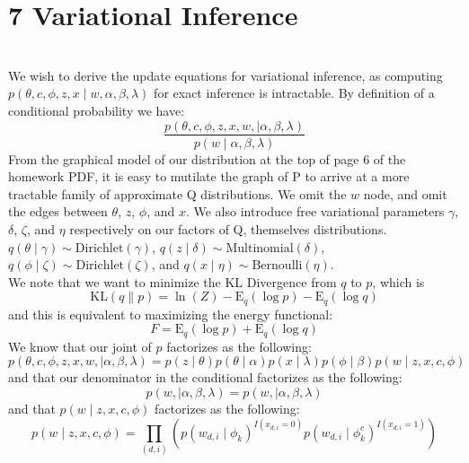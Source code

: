 \documentclass[12pt]{article}
\begin{document}
\section*{7 Variational Inference}
\\
We wish to derive the update equations for variational inference, as computing $p(\theta, c, \phi, z, x \mid w, \alpha, \beta, \lambda)$ for exact inference is intractable.  By definition of a conditional probability we have:
\begin{equation*}
\frac{p(\theta, c, \phi, z, x, w, \mid \alpha, \beta, \lambda)}{p(w \mid \alpha, \beta, \lambda)}
\end{equation*}
From the graphical model of our distribution at the top of page 6 of the homework PDF, it is easy to mutilate the graph of P to arrive at a more tractable family of approximate Q distributions.  We omit the $w$ node, and omit the edges between $\theta$, $z$, $\phi$, and $x$.  We also introduce free variational parameters $\gamma$, $\delta$, $\zeta$, and $\eta$ respectively on our factors of Q, themselves distributions.  $q(\theta \mid \gamma) \sim \mathrm{Dirichlet}(\gamma)$, $q(z \mid \delta) \sim \mathrm{Multinomial}(\delta)$, $q(\phi \mid \zeta) \sim \mathrm{Dirichlet}(\zeta)$, and $q(x \mid \eta) \sim \mathrm{Bernoulli}(\eta)$.\\
We note that we want to minimize the KL Divergence from $q$ to $p$, which is
\begin{equation*}
\mathrm{KL}(q\|p) = \ln(Z) - \mathrm{E}_q (\log p) - \mathrm{E}_q (\log q) 
\end{equation*}
and this is equivalent to maximizing the energy functional:
\begin{equation*}
F = \mathrm{E}_q (\log p) + \mathrm{E}_q (\log q)
\end{equation*}
We know that our joint of $p$ factorizes as the following:
\begin{equation*}
p(\theta, c, \phi, z, x, w, \mid \alpha, \beta, \lambda) = p(z \mid \theta) p(\theta \mid \alpha) p(x \mid \lambda) p(\phi \mid \beta) p(w \mid z, x, c, \phi)
\end{equation*}
and that our denominator in the conditional factorizes as the following:
\begin{equation*}
p(w, \mid \alpha, \beta, \lambda) = p(w, \mid \alpha, \beta, \lambda)
\end{equation*}
and that $p(w \mid z, x, c, \phi)$ factorizes as the following:
\begin{equation*}
p(w \mid z, x, c, \phi) = \prod_{(d,i)} ( p(w_{d,i} \mid \phi_k)^{I(x_{d,i} = 0)} p(w_{d,i} \mid \phi_{k}^{c})^{I(x_{d,i} = 1)} )
\end{equation*}
\end{document}
